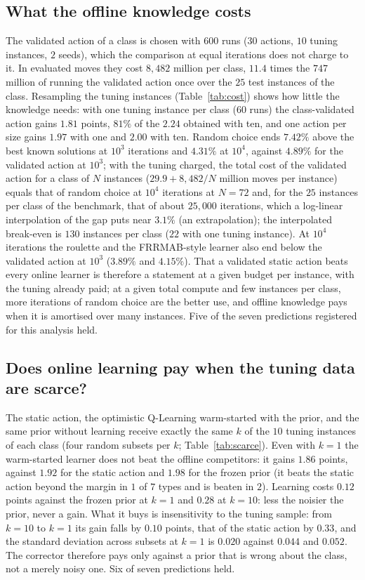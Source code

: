 \subsection{What the offline knowledge costs}
\label{sec:cost}
The validated action of a class is chosen with $600$ runs ($30$ actions, $10$ tuning instances, $2$ seeds), which the comparison at equal iterations does not charge to it. In evaluated moves they cost $8{,}482$ million per class, $11.4$ times the $747$ million of running the validated action once over the $25$ test instances of the class. Resampling the tuning instances (Table~\ref{tab:cost}) shows how little the knowledge needs: with one tuning instance per class ($60$ runs) the class-validated action gains $1.81$ points, $81\%$ of the $2.24$ obtained with ten, and one action per size gains $1.97$ with one and $2.00$ with ten. Random choice ends $7.42\%$ above the best known solutions at $10^3$ iterations and $4.31\%$ at $10^4$, against $4.89\%$ for the validated action at $10^3$; with the tuning charged, the total cost of the validated action for a class of $N$ instances ($29.9+8{,}482/N$ million moves per instance) equals that of random choice at $10^4$ iterations at $N=72$ and, for the $25$ instances per class of the benchmark, that of about $25{,}000$ iterations, which a log-linear interpolation of the gap puts near $3.1\%$ (an extrapolation); the interpolated break-even is $130$ instances per class ($22$ with one tuning instance). At $10^4$ iterations the roulette and the FRRMAB-style learner also end below the validated action at $10^3$ ($3.89\%$ and $4.15\%$). That a validated static action beats every online learner is therefore a statement at a given budget per instance, with the tuning already paid; at a given total compute and few instances per class, more iterations of random choice are the better use, and offline knowledge pays when it is amortised over many instances. Five of the seven predictions registered for this analysis held.



\subsection{Does online learning pay when the tuning data are scarce?}
\label{sec:scarce}
The static action, the optimistic Q-Learning warm-started with the prior, and the same prior without learning receive exactly the same $k$ of the $10$ tuning instances of each class (four random subsets per $k$; Table~\ref{tab:scarce}). Even with $k=1$ the warm-started learner does not beat the offline competitors: it gains $1.86$ points, against $1.92$ for the static action and $1.98$ for the frozen prior (it beats the static action beyond the margin in $1$ of $7$ types and is beaten in $2$). Learning costs $0.12$ points against the frozen prior at $k=1$ and $0.28$ at $k=10$: less the noisier the prior, never a gain. What it buys is insensitivity to the tuning sample: from $k=10$ to $k=1$ its gain falls by $0.10$ points, that of the static action by $0.33$, and the standard deviation across subsets at $k=1$ is $0.020$ against $0.044$ and $0.052$. The corrector therefore pays only against a prior that is wrong about the class, not a merely noisy one. Six of seven predictions held.

